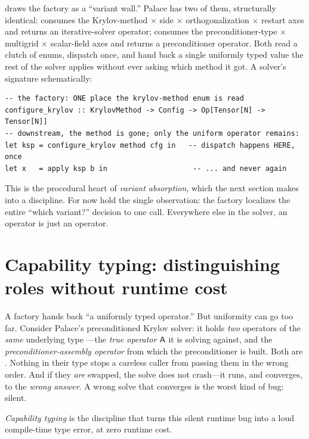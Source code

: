  draws the factory as a ``variant wall.'' Palace has two of them,
structurally identical:  consumes the
Krylov-method$\,\times\,$side$\,\times\,$orthogonalization$\,\times\,$restart axes and
returns an iterative-solver operator;  consumes the
preconditioner-type$\,\times\,$multigrid$\,\times\,$scalar-field axes and returns a
preconditioner operator. Both read a clutch of enums, dispatch once, and hand back a
single uniformly typed value the rest of the solver applies without ever asking which
method it got. A solver's signature schematically:

\begin{lstlisting}[style=l4style]
-- the factory: ONE place the krylov-method enum is read
configure_krylov :: KrylovMethod -> Config -> Op[Tensor[N] -> Tensor[N]]
-- downstream, the method is gone; only the uniform operator remains:
let ksp = configure_krylov method cfg in   -- dispatch happens HERE, once
let x   = apply ksp b in                    -- ... and never again
\end{lstlisting}

This is the procedural heart of \emph{variant absorption}, which the next section
makes into a discipline. For now hold the single observation: the factory localizes
the entire ``which variant?'' decision to one call. Everywhere else in the solver, an
operator is just an operator.

\section{Capability typing: distinguishing roles without runtime cost}

A factory hands back ``a uniformly typed operator.'' But uniformity can go too far.
Consider Palace's preconditioned Krylov solver: it holds \emph{two} operators of the
\emph{same} underlying type ---the \emph{true operator} $\mathsf{A}$ it is
solving against, and the \emph{preconditioner-assembly operator} from which the
preconditioner is built. Both are . Nothing in their type stops a
careless caller from passing them in the wrong order. And if they \emph{are} swapped,
the solve does not crash---it runs, and converges, to the \emph{wrong answer}. A wrong
solve that converges is the worst kind of bug: silent.

\emph{Capability typing} is the discipline that turns this silent runtime bug into a
loud compile-time type error, at zero runtime cost.

